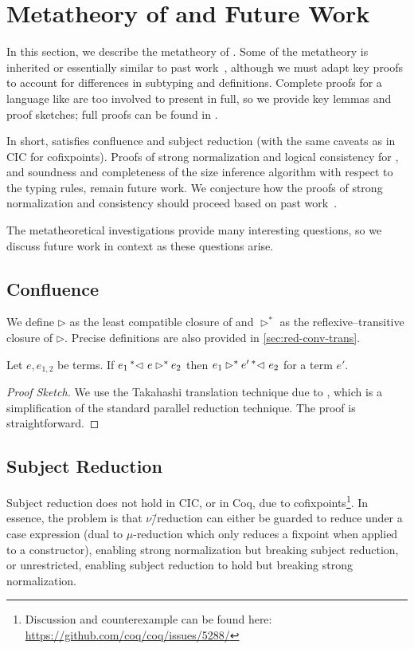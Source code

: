 \section{Metatheory of \titlelang and Future Work}
\label{sec:metatheory}

In this section, we describe the metatheory of \lang.
Some of the metatheory is inherited or essentially similar to past work~\citep{cic-hat-minus,cc-hat-omega,cic-hat}, although we must adapt key proofs to account for differences in subtyping and definitions.
Complete proofs for a language like \lang are too involved to present in full, so we provide key lemmas and proof sketches; full proofs can be found in \anotherpdf.

In short, \lang satisfies confluence and subject reduction (with the same caveats as in CIC for cofixpoints).
Proofs of strong normalization and logical consistency for \lang, and soundness and completeness of the size inference algorithm with respect to the typing rules, remain future work.
We conjecture how the proofs of strong normalization and consistency should proceed based on past work~\citep{cic-hat-minus,cc-hat-omega,cic-hat}.

The metatheoretical investigations provide many interesting questions, so we discuss future work in context as these questions arise.

\subsection{Confluence}

We define $\rhd$ as the least compatible closure of \reduction and $\rhd^*$ as the reflexive--transitive closure of $\rhd$. Precise definitions are also provided in \autoref{sec:red-conv-trans}.

\begin{theorem}[Confluence]
\label{thm:metatheory:confluence}
  Let $e, e_{1,2}$ be terms.
  If $e_1 \prescript{*}{}{\lhd ~ } e \rhd^* e_2$ then
  $e_1 \rhd^* e' \prescript{*}{}{\lhd ~ } e_2$
  for a term $e'$.
\end{theorem}
%
\begin{proof}[Proof Sketch]
  We use the Takahashi translation technique due to \citet{takahashitrans}, which is a simplification of the standard
  parallel reduction technique.
  The proof is straightforward.
\end{proof}

\subsection{Subject Reduction}
\label{sec:meta:sub-red}
Subject reduction does not hold in CIC, or in Coq, due to cofixpoints\footnote{Discussion and counterexample can be found here: \url{https://github.com/coq/coq/issues/5288/}}.
In essence, the problem is that $\nu$\=/reduction can either be guarded to reduce under a case expression (dual to $\mu$-reduction which only reduces a fixpoint when applied to a constructor), enabling strong normalization but breaking subject reduction, or unrestricted, enabling subject reduction to hold but breaking strong normalization.

